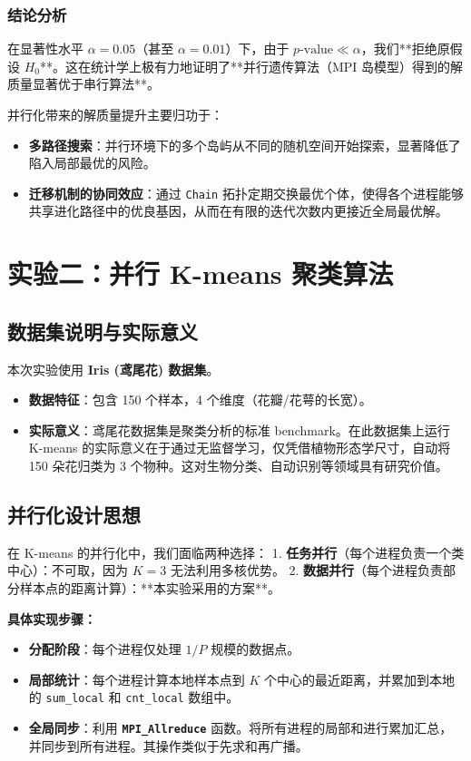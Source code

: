 \documentclass[11pt,a4paper]{article}
\begin{document}
\subsubsection{结论分析}
在显著性水平 $\alpha = 0.05$（甚至 $\alpha = 0.01$）下，由于 $p\text{-value} \ll \alpha$，我们**拒绝原假设 $H_0$**。这在统计学上极有力地证明了**并行遗传算法（MPI 岛模型）得到的解质量显著优于串行算法**。

并行化带来的解质量提升主要归功于：
\begin{itemize}
    \item \textbf{多路径搜索}：并行环境下的多个岛屿从不同的随机空间开始探索，显著降低了陷入局部最优的风险。
    \item \textbf{迁移机制的协同效应}：通过 \texttt{Chain} 拓扑定期交换最优个体，使得各个进程能够共享进化路径中的优良基因，从而在有限的迭代次数内更接近全局最优解。
\end{itemize}

\section{实验二：并行 K-means 聚类算法}

\subsection{数据集说明与实际意义}
本次实验使用 \textbf{Iris (鸢尾花) 数据集}。
\begin{itemize}
    \item \textbf{数据特征}：包含 150 个样本，4 个维度（花瓣/花萼的长宽）。
    \item \textbf{实际意义}：鸢尾花数据集是聚类分析的标准 benchmark。在此数据集上运行 K-means 的实际意义在于通过无监督学习，仅凭借植物形态学尺寸，自动将 150 朵花归类为 3 个物种。这对生物分类、自动识别等领域具有研究价值。
\end{itemize}

\subsection{并行化设计思想}
在 K-means 的并行化中，我们面临两种选择：
1. \textbf{任务并行}（每个进程负责一个类中心）：不可取，因为 $K=3$ 无法利用多核优势。
2. \textbf{数据并行}（每个进程负责部分样本点的距离计算）：**本实验采用的方案**。

\textbf{具体实现步骤：}
\begin{itemize}
    \item \textbf{分配阶段}：每个进程仅处理 $1/P$ 规模的数据点。
    \item \textbf{局部统计}：每个进程计算本地样本点到 $K$ 个中心的最近距离，并累加到本地的 \texttt{sum\_local} 和 \texttt{cnt\_local} 数组中。
    \item \textbf{全局同步}：利用 \textbf{\texttt{MPI\_Allreduce}} 函数。将所有进程的局部和进行累加汇总，并同步到所有进程。其操作类似于先求和再广播。
\end{itemize}
\end{document}
